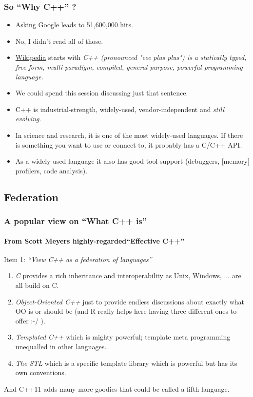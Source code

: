 \documentclass[dvipsnames,handout,compress,pdflatex,beamer]{beamer}
\begin{document}
\begin{frame}
  \frametitle{So ``Why C++'' ?}

  \pause
  \begin{itemize}[<+->]
  \item Asking Google leads to 51,600,000 hits. 
  \item No, I didn't read all of those.
  \item \href{http://en.wikipedia.org/wiki/C\%2B\%2B}{Wikipedia} starts with
    \emph{C++ (pronounced "cee plus plus") is a statically typed,
      free-form, multi-paradigm, compiled, general-purpose, powerful
      programming language.}  
  \item We could spend this session discussing just that sentence.
  \item C++ is industrial-strength, widely-used, vendor-independent and
    \emph{still evolving}.
  \item In science and research, it is one of the most widely-used
    languages.  If there is something you want to use or connect to, it
    probably has a C/C++ API.
  \item As a widely used language it also has good tool support (debuggers,
    [memory] profilers, code analysis).
  \end{itemize}
\end{frame}

\subsection{Federation}
\begin{frame}
  \frametitle{A popular view on ``What C++ is''}
  \framesubtitle{From Scott Meyers highly-regarded``Effective C++''}

  \pause

  Item 1:   \emph{``View C++ as a federation of languages''}

  \pause

  \begin{enumerate}[<+->]
  \item \emph{C} provides a rich inheritance and interoperability as Unix, Windows,
    ... are all build on C.
  \item \emph{Object-Oriented C++} just to provide endless discussions about
    exactly what OO is or should be (and R really helps here having
    three different ones to offer :-/ ).
  \item \emph{Templated C++} which is mighty powerful; template meta
    programming unequalled in other languages.
  \item \emph{The STL} which is a specific template library which is powerful but
    has its own conventions.
  \end{enumerate}
  
  \pause And C++11 adds many more goodies that could be called a fifth language.
\end{frame}
\end{document}
